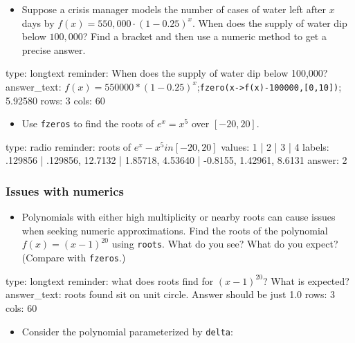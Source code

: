 \documentclass[12pt]{article}
\begin{document}
\begin{itemize}
\itemsep1pt\parskip0pt
\item
  Suppose a crisis manager models the number of cases of water left
  after $x$ days by $f(x) = 550,000 \cdot (1 - 0.25)^x$. When does the
  supply of water dip below $100,000$? Find a bracket and then use a
  numeric method to get a precise answer.
\end{itemize}

\begin{answer}
type: longtext
reminder: When does the supply of water dip below 100,000?
answer_text: \(f(x) = 550000*(1-0.25)^x\);\verb+fzero(x->f(x)-100000,[0,10])+; 5.92580 
rows: 3
cols: 60
\end{answer}

\begin{itemize}
\itemsep1pt\parskip0pt
\item
  Use \texttt{fzeros} to find the roots of $e^x = x^5$ over $[-20,20]$.
\end{itemize}

\begin{answer}
type: radio
reminder: roots of \( e^x - x^5 in [-20,20] \)
values: 1 | 2 | 3 | 4
labels: .129856 | .129856, 12.7132 | 1.85718, 4.53640 | -0.8155, 1.42961, 8.6131
answer: 2
\end{answer}

\subsubsection{Issues with numerics}

\begin{itemize}
\itemsep1pt\parskip0pt
\item
  Polynomials with either high multiplicity or nearby roots can cause
  issues when seeking numeric approximations. Find the roots of the
  polynomial $f(x) = (x-1)^{20}$ using \texttt{roots}. What do you see?
  What do you expect? (Compare with \texttt{fzeros}.)
\end{itemize}

\begin{answer}
type: longtext
reminder: what does roots find for \( (x-1)^{20} \)? What is expected?
answer_text: roots found sit on unit circle. Answer should be just 1.0 
rows: 3
cols: 60
\end{answer}

\begin{itemize}
\itemsep1pt\parskip0pt
\item
  Consider the polynomial parameterized by \texttt{delta}:
\end{itemize}
\end{document}
